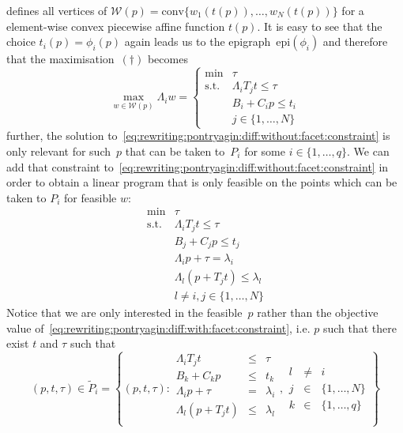 \documentclass{elsarticle}
\providecommand{\conv}{\text{conv}}
\providecommand{\epi}{\text{epi}}
\theoremstyle{remark}
\theoremstyle{definition}
\begin{document}
%
defines all vertices of $\mathcal W(p) = \conv\{w_1(t(p)),\dots,w_N(t(p))\}$ for a element-wise convex piecewise affine function $t(p)$.
%
It is easy to see that the choice $t_i(p)=\phi_i(p)$ again leads us to the epigraph~$\epi(\phi_i)$ and therefore that the maximisation~$(\dagger)$ becomes
%
\begin{equation}\label{eq:rewriting:pontryagin:diff:without:facet:constraint}
  \max_{w\in\mathcal W(p)}\Lambda_i w = \left\{\begin{array}{rl}
  \min& \tau\\
  \text{s.t.}& \Lambda_iT_jt\leq\tau\\
  & B_i+C_ip\leq t_i\\
  & j\in\{1,\dots,N\}
  \end{array}\right.
\end{equation}
%
further, the solution to~\eqref{eq:rewriting:pontryagin:diff:without:facet:constraint} is only relevant for such~$p$ that can be taken to~$P_i$ for some $i\in\{1,\dots,q\}$.
%
We can add that constraint to~\eqref{eq:rewriting:pontryagin:diff:without:facet:constraint} in order to obtain a linear program that is only feasible on the points which can be taken to $P_i$ for feasible $w$:
%
\begin{equation}\label{eq:rewriting:pontryagin:diff:with:facet:constraint}
  \begin{array}{rl}
  \min& \tau\\
  \text{s.t.}& \Lambda_iT_jt\leq\tau\\
  & B_j+C_j p\leq t_j\\
  &\Lambda_i p + \tau=\lambda_i\\
  &\Lambda_l(p + T_jt)\leq\lambda_l\\
  &l\neq i, j\in\{1,\dots,N\}
  \end{array}
\end{equation}
%
Notice that we are only interested in the feasible~$p$ rather than the objective value of~\eqref{eq:rewriting:pontryagin:diff:with:facet:constraint}, i.e. $p$ such that there exist $t$ and $\tau$ such that 
%
\begin{equation}
  (p,t,\tau)\in\tilde P_i=\left\{(p,t,\tau):\begin{array}{rcl}
  \Lambda_iT_jt&\leq&\tau\\
  B_k+C_k p&\leq& t_k\\
  \Lambda_i p + \tau&=&\lambda_i\\
  \Lambda_l(p + T_jt)&\leq&\lambda_l\\
  \end{array},\begin{array}{rcl}
   l&\neq& i\\
   j&\in&\{1,\dots,N\}\\k&\in&\{1,\dots,q\}\end{array}
   \right\}
\end{equation}
\end{document}
